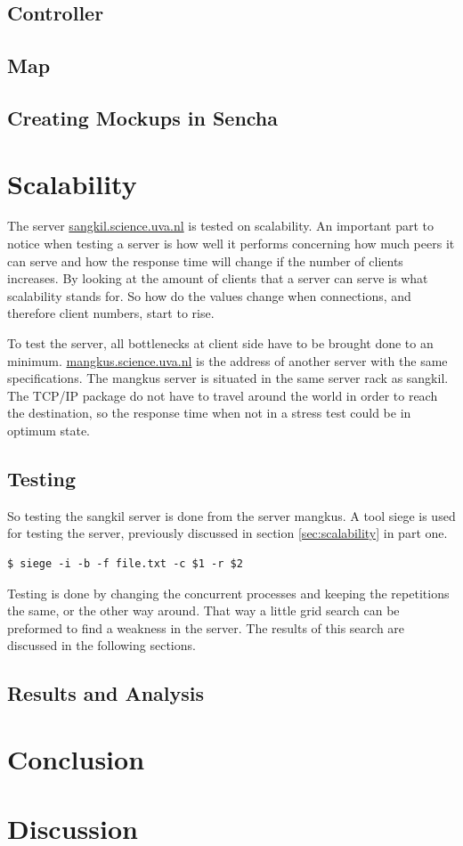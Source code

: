 \subsection{Controller}

\subsection{Map}

\subsection{Creating Mockups in Sencha}

\section{Scalability}
The server \url{sangkil.science.uva.nl} is tested on scalability. An important part to notice when testing a server is how well it performs concerning how much peers it can serve and how the response time will change if the number of clients increases. By looking at the amount of clients that a server can serve is what scalability stands for. So how do the values change when connections, and therefore client numbers, start to rise.

To test the server, all bottlenecks at client side have to be brought done to an minimum. \url{mangkus.science.uva.nl} is the address of another server with the same specifications. The mangkus server is situated in the same server rack as sangkil. The TCP/IP package do not have to travel around the world in order to reach the destination, so the response time when not in a stress test could be in optimum state. 

\subsection{Testing}
So testing the sangkil server is done from the server mangkus. A tool siege is used for testing the server, previously discussed in section \ref{sec:scalability} in part one.
\begin{lstlisting}
$ siege -i -b -f file.txt -c $1 -r $2
\end{lstlisting}
 Testing is done by changing the concurrent processes and keeping the repetitions the same, or the other way around. That way a little grid search can be preformed to find a weakness in the server. The results of this search are discussed in the following sections.

\subsection{Results and Analysis}


\section{Conclusion}

\section{Discussion}

